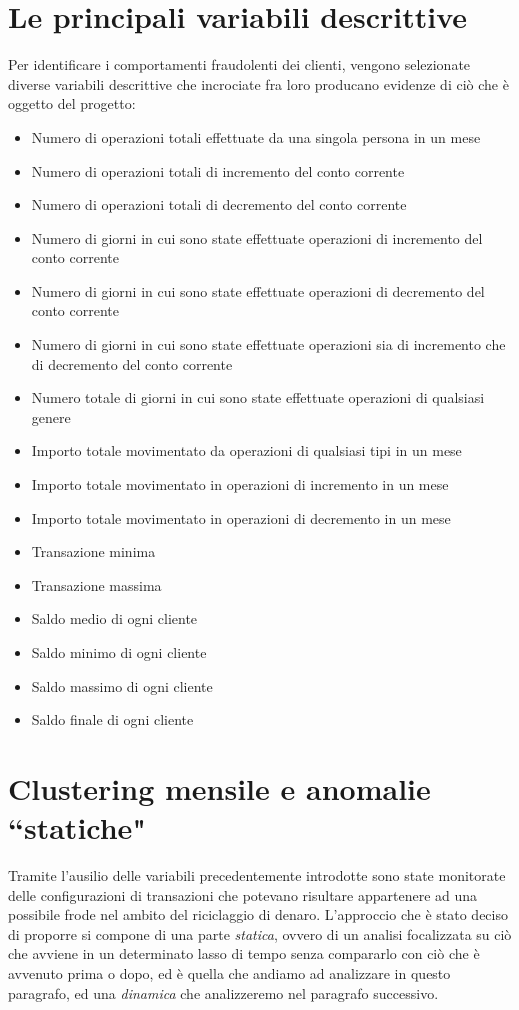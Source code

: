 \section{Le principali variabili descrittive}

Per identificare i comportamenti fraudolenti dei clienti, vengono selezionate diverse variabili descrittive che incrociate fra loro producano evidenze di ciò che è oggetto del progetto:
\begin{itemize}
\item Numero di operazioni totali effettuate da una singola persona in un mese
\item Numero di operazioni totali di incremento del conto corrente
\item Numero di operazioni totali di decremento del conto corrente
\item Numero di giorni in cui sono state effettuate operazioni di incremento del conto corrente
\item Numero di giorni in cui sono state effettuate operazioni di decremento del conto corrente
\item Numero di giorni in cui sono state effettuate operazioni sia di incremento che di decremento del conto corrente
\item Numero totale di giorni in cui sono state effettuate operazioni di qualsiasi genere
\item Importo totale movimentato da operazioni di qualsiasi tipi in un mese
\item Importo totale movimentato in operazioni di incremento in un mese
\item Importo totale movimentato in operazioni di decremento in un mese
\item Transazione minima 
\item Transazione massima 
\item Saldo medio di ogni cliente 
\item Saldo minimo di ogni cliente 
\item Saldo massimo di ogni cliente 
\item Saldo finale di ogni cliente 
\end{itemize}


\section{Clustering mensile e anomalie ``statiche"}
Tramite l'ausilio delle variabili precedentemente introdotte sono state monitorate delle configurazioni di transazioni che potevano risultare appartenere ad una  possibile frode nel ambito del riciclaggio di denaro.
L'approccio che è stato deciso di proporre si compone di una parte \textit{statica}, ovvero di un analisi focalizzata su ciò che avviene in un determinato lasso di tempo senza compararlo con ciò che è avvenuto prima o dopo, ed è quella che andiamo ad analizzare in questo paragrafo, ed una \textit{dinamica} che analizzeremo nel paragrafo successivo.

